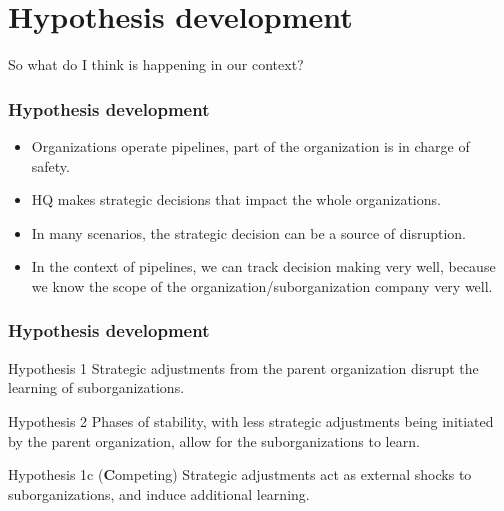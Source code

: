 \section{Hypothesis development}

\begin{frame}
	\Large So what do I think is happening in our context?
\end{frame}

\begin{frame}
	\frametitle{Hypothesis development}
	\begin{itemize}
		\item Organizations operate pipelines, part of the organization is in charge of safety.
		\pause
		\item HQ makes strategic decisions that impact the whole organizations.
		\pause
		\item In many scenarios, the strategic decision can be a source of disruption.
		\pause
		\item In the context of pipelines, we can track decision making very well, because we know the scope of the organization/suborganization company very well.
	\end{itemize}
\end{frame}

\begin{frame}
	\frametitle{Hypothesis development}
	\begin{block}{Hypothesis 1}
		Strategic adjustments from the parent organization disrupt the learning of suborganizations.
	\end{block}
	\pause
	
	\begin{block}{Hypothesis 2}
		Phases of stability, with less strategic adjustments being initiated by the parent organization, allow for the suborganizations to learn.
	\end{block}
	\pause
	
	\begin{block}{Hypothesis 1c \small (\textbf{C}ompeting)}
		Strategic adjustments act as external shocks to suborganizations, and induce additional learning.
	\end{block}
\end{frame}